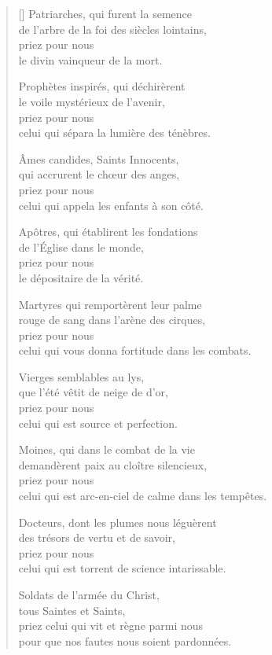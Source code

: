 \documentclass[a4paper,12pt]{book}
\begin{document}
\settowidth{\versewidth}{celui qui est arc-en-ciel de calme dans les tempêtes.}


\begin{verse}[\versewidth]
  Patriarches, qui furent la semence \\
  de l'arbre de la foi des siècles lointains, \\
  priez pour nous \\
  le divin vainqueur de la mort.

  Prophètes inspirés, qui déchirèrent \\
  le voile mystérieux de l'avenir, \\
  priez pour nous \\
  celui qui sépara la lumière des ténèbres.

  Âmes candides, Saints Innocents, \\
  qui accrurent le chœur des anges, \\
  priez pour nous \\
  celui qui appela les enfants à son côté.

  Apôtres, qui établirent les fondations \\
  de l'Église dans le monde, \\
  priez pour nous \\
  le dépositaire de la vérité.

  Martyres qui remportèrent leur palme \\
  rouge de sang dans l'arène des cirques, \\
  priez pour nous \\
  celui qui vous donna fortitude dans les combats.

  Vierges semblables au lys, \\
  que l'été vêtit de neige de d'or, \\
  priez pour nous \\
  celui qui est source et perfection.

  Moines, qui dans le combat de la vie \\
  demandèrent paix au cloître silencieux, \\
  priez pour nous \\
  celui qui est arc-en-ciel de calme dans les tempêtes.

  Docteurs, dont les plumes nous léguèrent \\
  des trésors de vertu et de savoir, \\
  priez pour nous \\
  celui qui est torrent de science intarissable.

  Soldats de l'armée du Christ, \\
  tous Saintes et Saints, \\
  priez celui qui vit et règne parmi nous \\
  pour que nos fautes nous soient pardonnées.
\end{verse}
\end{document}
